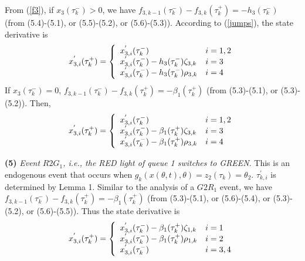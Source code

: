 \documentclass{ifacconf}\usepackage{graphicx}
\begin{document}
From (\ref{f3}), if $x_{3}(\tau_{k}^{-})>0$, we have $f_{3,k-1}(\tau_{k}^{-})-f_{3,k}(\tau_{k}^{+})=-h_{3}(\tau_{k}^{-})$ (from (5.4)-(5.1), or
(5.5)-(5.2), or (5.6)-(5.3)). According to (\ref{jumps}), the state derivative
is
\begin{equation}
x_{3,i}^{^{\prime}}(\tau_{k}^{+})=\left\{
\begin{array}
[c]{ll}x_{3,i}^{^{\prime}}(\tau_{k}^{-}) & i=1,2\\
x_{3,i}^{^{\prime}}(\tau_{k}^{-})-h_{3}(\tau_{k}^{-})\zeta_{3,k} & i=3\\
x_{3,i}^{^{\prime}}(\tau_{k}^{-})-h_{3}(\tau_{k}^{-})\rho_{3,k} & i=4
\end{array}
\right.  \label{type4di1}\end{equation}
If $x_{3}(\tau_{k}^{-})=0$, $f_{3,k-1}(\tau_{k}^{-})-f_{3,k}(\tau_{k}^{+})=-\beta_{1}(\tau_{k}^{+})$ (from (5.3)-(5.1), or (5.3)-(5.2)). Then,
\begin{equation}
x_{3,i}^{^{\prime}}(\tau_{k}^{+})=\left\{
\begin{array}
[c]{ll}x_{3,i}^{^{\prime}}(\tau_{k}^{-}) & i=1,2\\
x_{3,i}^{^{\prime}}(\tau_{k}^{-})-\beta_{1}(\tau_{k}^{+})\zeta_{3,k} & i=3\\
x_{3,i}^{^{\prime}}(\tau_{k}^{-})-\beta_{1}(\tau_{k}^{+})\rho_{3,k} & i=4
\end{array}
\right.  \label{type4di2}\end{equation}


\textbf{(5)} \emph{Event }$R2G_{1}$\emph{, i.e., the RED light of queue 1
switches to GREEN}. This is an endogenous event that occurs when
$g_{k}(x(\theta,t),\theta)=z_{2}(\tau_{k})=\theta_{2}$. $\tau_{k,i}^{\prime}$
is determined by Lemma 1. Similar to the analysis of a $G2R_{1}$ event, we
have $f_{3,k-1}(\tau_{k}^{-})-f_{3,k}(\tau_{k}^{+})=-\beta_{1}(\tau_{k}^{+})$
(from (5.3)-(5.1), or (5.6)-(5.4), or (5.3)-(5.2), or (5.6)-(5.5)). Thus the
state derivative is
\begin{equation}
x_{3,i}^{^{\prime}}(\tau_{k}^{+})=\left\{
\begin{array}
[c]{ll}x_{3,i}^{^{\prime}}(\tau_{k}^{-})-\beta_{1}(\tau_{k}^{+})\zeta_{1,k} & i=1\\
x_{3,i}^{^{\prime}}(\tau_{k}^{-})-\beta_{1}(\tau_{k}^{+})\rho_{1,k} & i=2\\
x_{3,i}^{^{\prime}}(\tau_{k}^{-}) & i=3,4
\end{array}
\right.  \label{type5di}\end{equation}
\end{document}
